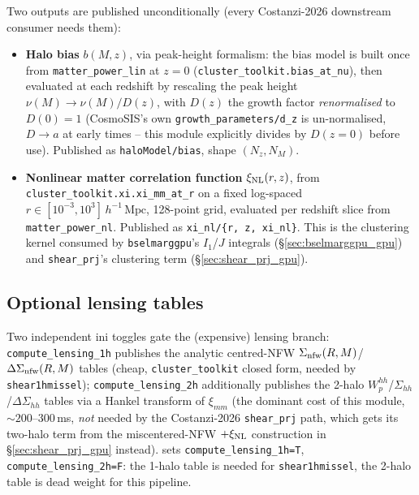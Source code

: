 \documentclass[a4paper, 11pt]{article}
\newcommand{\xinl}{\xi_{\rm NL}}
\newcommand{\hMpc}{h^{-1}\,\mathrm{Mpc}}
\newcommand{\modname}[1]{\textcolor{kwcol}{\texttt{#1}}}
\newcommand{\blk}[1]{\textcolor{datablockcol}{\texttt{#1}}}
\newcommand{\pyfile}[1]{{\small\path{#1}}}
\begin{document}
Two outputs are published unconditionally (every Costanzi-2026 downstream
consumer needs them):
\begin{itemize}
  \setlength\itemsep{2pt}
  \item \textbf{Halo bias} $b(M,z)$, via peak-height formalism: the bias
    model is built once from \blk{matter\_power\_lin} at $z=0$
    (\texttt{cluster\_toolkit.bias\_at\_nu}), then evaluated at each
    redshift by rescaling the peak height $\nu(M) \to \nu(M)/D(z)$, with
    $D(z)$ the growth factor \emph{renormalised} to $D(0)=1$ (CosmoSIS's
    own \blk{growth\_parameters/d\_z} is un-normalised, $D\to a$ at early
    times -- this module explicitly divides by $D(z{=}0)$ before use).
    Published as \blk{haloModel/bias}, shape $(N_z, N_M)$.
  \item \textbf{Nonlinear matter correlation function} $\xinl(r,z)$, from
    \texttt{cluster\_toolkit.xi.xi\_mm\_at\_r} on a fixed log-spaced
    $r\in[10^{-3},10^{3}]\,\hMpc$, 128-point grid, evaluated per redshift
    slice from \blk{matter\_power\_nl}. Published as \blk{xi\_nl/\{r, z,
    xi\_nl\}}. This is the clustering kernel consumed by
    \modname{bselmarggpu}'s $I_1$/$J$ integrals
    (\S\ref{sec:bselmarggpu_gpu}) and \modname{shear\_prj}'s
    clustering term (\S\ref{sec:shear_prj_gpu}).
\end{itemize}

\subsection{Optional lensing tables}

Two independent ini toggles gate the (expensive) lensing branch:
\texttt{compute\_lensing\_1h} publishes the analytic centred-NFW
$\Sigma_{\rm nfw}(R,M)$/$\Delta\Sigma_{\rm nfw}(R,M)$ tables (cheap,
\texttt{cluster\_toolkit} closed form, needed by \modname{shear1hmissel});
\texttt{compute\_lensing\_2h} additionally publishes the 2-halo
$W_p^{hh}$/$\Sigma_{hh}$/$\Delta\Sigma_{hh}$ tables via a Hankel transform
of $\xi_{mm}$ (the dominant cost of this module, $\sim 200$--$300$\,ms,
\emph{not} needed by the Costanzi-2026 \modname{shear\_prj} path, which
gets its two-halo term from the miscentered-NFW $+\xinl$ construction in
\S\ref{sec:shear_prj_gpu} instead). \pyfile{shearTot_pipeline.ini}
sets \texttt{compute\_lensing\_1h=T}, \texttt{compute\_lensing\_2h=F}: the
1-halo table is needed for \modname{shear1hmissel}, the 2-halo table is
dead weight for this pipeline.

\end{document}
